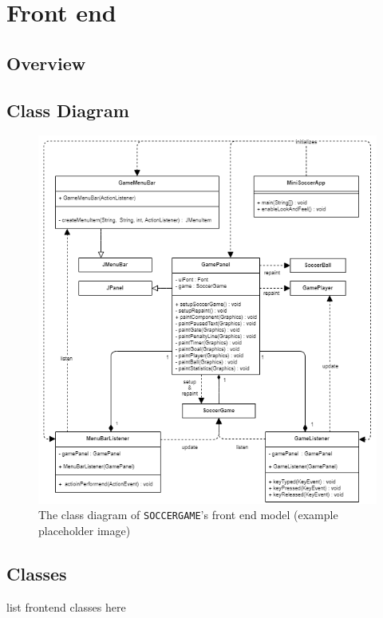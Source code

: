 \documentclass[12pt, dvipsnames, a4paper]{article}
\newcommand{\code}[1]{\texttt{#1}}
\begin{document}
\section{Front end}
\subsection{Overview}

\subsection{Class Diagram}
\begin{center}
	\begin{figure}[H]
		\hspace{50pt}
		\includegraphics[scale=0.6]{diagrams/class-diagrams/gui-model/gui-model-cd.png}
		\caption{The class diagram of \code{SOCCERGAME}'s front end model (example placeholder image)}
		\label{fig:frontend}
	\end{figure}
\end{center}
\clearpage
\subsection{Classes}
list frontend classes here
\end{document}
